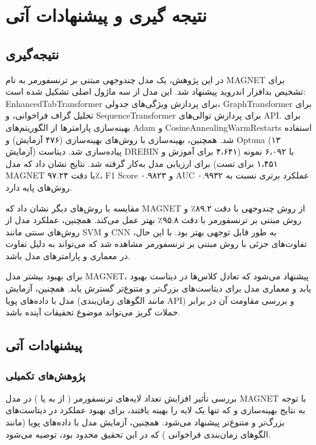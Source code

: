 \clearpage
\thispagestyle{empty}
\chapter{نتیجه گیری و پیشنهادات آتی}\label{chap5}

\section{نتیجه‌گیری}
در این پژوهش، یک مدل چندوجهی مبتنی بر ترنسفورمر به نام MAGNET برای تشخیص بدافزار اندروید پیشنهاد شد. این مدل از سه ماژول اصلی تشکیل شده است: EnhancedTabTransformer برای پردازش ویژگی‌های جدولی، GraphTransformer برای تحلیل گراف فراخوانی، و SequenceTransformer برای پردازش توالی‌های API. برای بهینه‌سازی پارامترها از الگوریتم‌های Adam و CosineAnnealingWarmRestarts استفاده شد. همچنین، بهینه‌سازی با روش‌های بهینه‌سازی (۴۷۶ آزمایش) و Optuna (۱۳ آزمایش) پیاده‌سازی شد. دیتاست DREBIN \cite{Drebin} با ۶،۰۹۲ نمونه (۴،۶۴۱ برای آموزش و ۱،۴۵۱ برای تست) برای ارزیابی مدل به‌کار گرفته شد. نتایج نشان داد که مدل MAGNET با دقت ۹۷.۲۴٪، F1 Score ۰.۹۸۲۳ و AUC ۰.۹۹۳۲ عملکرد برتری نسبت به روش‌های پایه دارد.

مقایسه با روش‌های دیگر نشان داد که MAGNET از روش چندوجهی \cite{Alsaleh2023} با دقت ۸۹.۲٪ و روش مبتنی بر ترنسفورمر \cite{TransformerMalware} با دقت ۹۵.۸٪ بهتر عمل می‌کند. همچنین، عملکرد مدل از روش‌های سنتی مانند SVM \cite{ZhangNix2017} و CNN \cite{Vinayakumar2019} به طور قابل توجهی بهتر بود. با این حال، تفاوت‌های جزئی با روش مبتنی بر ترنسفورمر مشاهده شد که می‌تواند به دلیل تفاوت در معماری و پارامترهای مدل باشد.

برای بهبود بیشتر مدل MAGNET، پیشنهاد می‌شود که تعادل کلاس‌ها در دیتاست بهبود یابد و معماری مدل برای دیتاست‌های بزرگ‌تر و متنوع‌تر گسترش یابد. همچنین، آزمایش مدل با داده‌های پویا (مانند الگوهای زمان‌بندی API) و بررسی مقاومت آن در برابر حملات گریز می‌تواند موضوع تحقیقات آینده باشد.

\section{پیشنهادات آتی}
\subsection{پژوهش‌های تکمیلی}
بررسی تأثیر افزایش تعداد لایه‌های ترنسفورمر ( از  به  یا ) در مدل MAGNET با توجه به نتایج بهینه‌سازی و  \cite{Optuna2019} که تنها یک لایه را بهینه یافتند، برای بهبود عملکرد در دیتاست‌های بزرگ‌تر و متنوع‌تر پیشنهاد می‌شود. همچنین، آزمایش مدل با داده‌های پویا (مانند الگوهای زمان‌بندی فراخوانی ) که در این تحقیق محدود بود، توصیه می‌شود.

